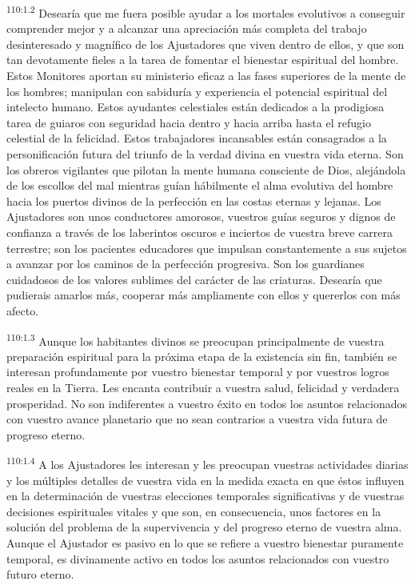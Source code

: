 \par
\textsuperscript{110:1.2} Desearía que me fuera posible ayudar a los mortales evolutivos a conseguir comprender mejor y a alcanzar una apreciación más completa del trabajo desinteresado y magnífico de los Ajustadores que viven dentro de ellos, y que son tan devotamente fieles a la tarea de fomentar el bienestar espiritual del hombre. Estos Monitores aportan su ministerio eficaz a las fases superiores de la mente de los hombres; manipulan con sabiduría y experiencia el potencial espiritual del intelecto humano. Estos ayudantes celestiales están dedicados a la prodigiosa tarea de guiaros con seguridad hacia dentro y hacia arriba hasta el refugio celestial de la felicidad. Estos trabajadores incansables están consagrados a la personificación futura del triunfo de la verdad divina en vuestra vida eterna. Son los obreros vigilantes que pilotan la mente humana consciente de Dios, alejándola de los escollos del mal mientras guían hábilmente el alma evolutiva del hombre hacia los puertos divinos de la perfección en las costas eternas y lejanas. Los Ajustadores son unos conductores amorosos, vuestros guías seguros y dignos de confianza a través de los laberintos oscuros e inciertos de vuestra breve carrera terrestre; son los pacientes educadores que impulsan constantemente a sus sujetos a avanzar por los caminos de la perfección progresiva. Son los guardianes cuidadosos de los valores sublimes del carácter de las criaturas. Desearía que pudierais amarlos más, cooperar más ampliamente con ellos y quererlos con más afecto.

\par
\textsuperscript{110:1.3} Aunque los habitantes divinos se preocupan principalmente de vuestra preparación espiritual para la próxima etapa de la existencia sin fin, también se interesan profundamente por vuestro bienestar temporal y por vuestros logros reales en la Tierra. Les encanta contribuir a vuestra salud, felicidad y verdadera prosperidad. No son indiferentes a vuestro éxito en todos los asuntos relacionados con vuestro avance planetario que no sean contrarios a vuestra vida futura de progreso eterno.

\par
\textsuperscript{110:1.4} A los Ajustadores les interesan y les preocupan vuestras actividades diarias y los múltiples detalles de vuestra vida en la medida exacta en que éstos influyen en la determinación de vuestras elecciones temporales significativas y de vuestras decisiones espirituales vitales y que son, en consecuencia, unos factores en la solución del problema de la supervivencia y del progreso eterno de vuestra alma. Aunque el Ajustador es pasivo en lo que se refiere a vuestro bienestar puramente temporal, es divinamente activo en todos los asuntos relacionados con vuestro futuro eterno.

